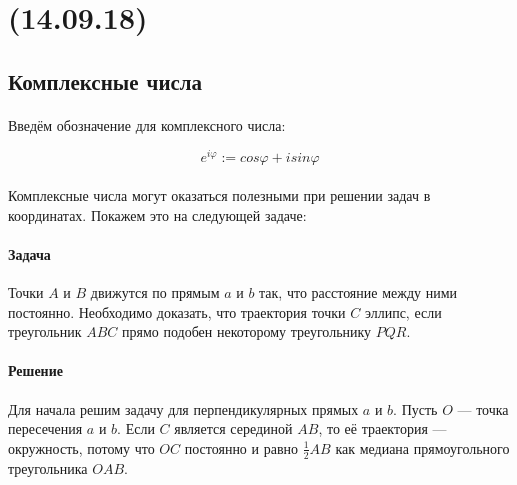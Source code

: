 \documentclass[dvipdfmx]{article}
\begin{document}
\noindent\makebox[\linewidth]{\rule{\paperwidth}{0.4pt}}
\section{(14.09.18)}
\noindent\makebox[\linewidth]{\rule{\paperwidth}{0.4pt}}

\subsection{Комплексные числа}
\paragraph{}

Введём обозначение для комплексного числа:

\begin{equation*}
  e^{i\varphi} := cos\varphi + isin\varphi
\end{equation*}

\paragraph{}

Комплексные числа могут оказаться полезными при решении задач в координатах. Покажем это на следующей задаче:

\paragraph{Задача}

Точки $A$ и $B$ движутся по прямым $a$ и $b$ так, что расстояние между ними постоянно.
Необходимо доказать, что траектория точки $C$ эллипс, если треугольник $ABC$ прямо подобен некоторому треугольнику $PQR$.

\paragraph{Решение}

Для начала решим задачу для перпендикулярных прямых $a$ и $b$. Пусть $O$ --- точка пересечения $a$ и $b$.
Если $C$ является серединой $AB$, то её траектория --- окружность, потому что $OC$ постоянно и равно $\frac{1}{2}AB$ как
медиана прямоугольного треугольника $OAB$.

\paragraph{}
\end{document}
